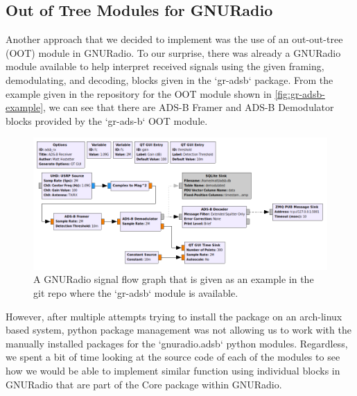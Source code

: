 \documentclass[conference, onecolumn]{IEEEtran}
\begin{document}
\subsection{Out of Tree Modules for GNURadio}
Another approach that we decided to implement was the use of an out-out-tree (OOT) module \cite{oot-adsb} in GNURadio. To our surprise, there was already a GNURadio module available to help interpret received signals using the given framing, demodulating, and decoding, blocks given in the `gr-adsb` package. From the example given in the repository for the OOT module shown in \autoref{fig:gr-adsb-example}, we can see that there are ADS-B Framer and ADS-B Demodulator blocks provided by the `gr-ads-b` OOT module. 

\begin{figure}
  \begin{center}
    \includegraphics[width=\textwidth]{./figures/adsb_rx.png}
  \end{center}
  \caption{A GNURadio signal flow graph that is given as an example in the git repo where the `gr-adsb` module is available.}\label{fig:gr-adsb-example}
\end{figure}

However, after multiple attempts trying to install the package on an arch-linux based system, python package management was not allowing us to work with the manually installed packages for the `gnuradio.adsb` python modules. Regardless, we spent a bit of time looking at the source code of each of the modules to see how we would be able to implement similar function using individual blocks in GNURadio that are part of the Core package within GNURadio.

\end{document}
